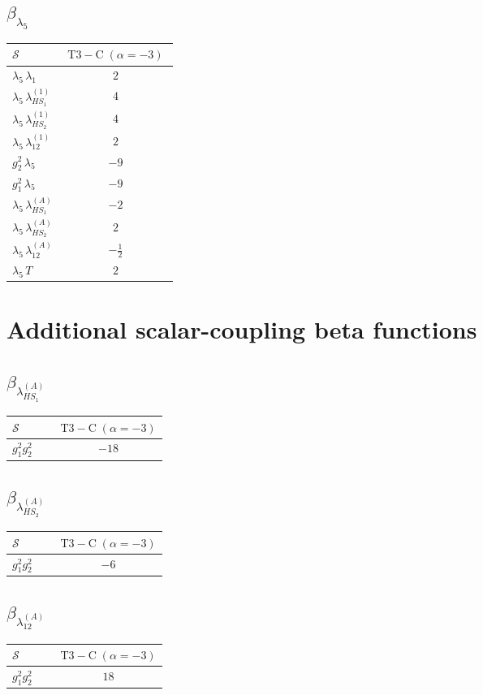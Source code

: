 \documentclass[9pt]{article}
\begin{document}
\subsection*{$ \beta_{\lambda_5} $}
\begin{longtable}{@{}p{0.31\linewidth}c@{}}
\toprule
$\mathcal{S}$ & $ \mathrm{T3-C}\;(\alpha=-3) $ \\
\midrule
$ \lambda_5\,\lambda_1 $ & $ 2 $ \\
$ \lambda_5\,\lambda_{HS_1}^{(1)} $ & $ 4 $ \\
$ \lambda_5\,\lambda_{HS_2}^{(1)} $ & $ 4 $ \\
$ \lambda_5\,\lambda_{12}^{(1)} $ & $ 2 $ \\
$ g_2^2\,\lambda_5 $ & $ -9 $ \\
$ g_1^2\,\lambda_5 $ & $ -9 $ \\
$ \lambda_5\,\lambda_{HS_1}^{(A)} $ & $ -2 $ \\
$ \lambda_5\,\lambda_{HS_2}^{(A)} $ & $ 2 $ \\
$ \lambda_5\,\lambda_{12}^{(A)} $ & $ - \frac{1}{2} $ \\
$ \lambda_5\,T $ & $ 2 $ \\
\bottomrule
\end{longtable}
\section*{Additional scalar-coupling beta functions}
\subsection*{$ \beta_{\lambda_{HS_1}^{(A)}} $}
\begin{longtable}{@{}p{0.31\linewidth}c@{}}
\toprule
$\mathcal{S}$ & $ \mathrm{T3-C}\;(\alpha=-3) $ \\
\midrule
$ g_1^2g_2^2 $ & $ -18 $ \\
\bottomrule
\end{longtable}
\subsection*{$ \beta_{\lambda_{HS_2}^{(A)}} $}
\begin{longtable}{@{}p{0.31\linewidth}c@{}}
\toprule
$\mathcal{S}$ & $ \mathrm{T3-C}\;(\alpha=-3) $ \\
\midrule
$ g_1^2g_2^2 $ & $ -6 $ \\
\bottomrule
\end{longtable}
\subsection*{$ \beta_{\lambda_{12}^{(A)}} $}
\begin{longtable}{@{}p{0.31\linewidth}c@{}}
\toprule
$\mathcal{S}$ & $ \mathrm{T3-C}\;(\alpha=-3) $ \\
\midrule
$ g_1^2g_2^2 $ & $ 18 $ \\
\bottomrule
\end{longtable}
\end{document}
